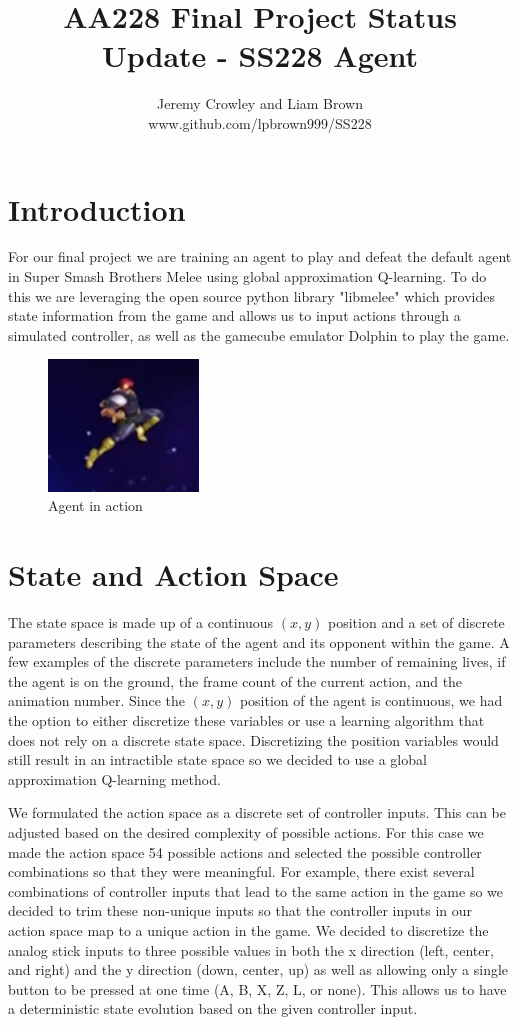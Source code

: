 \documentclass[11pt]{article}
\title{\vspace{-0cm}AA228 Final Project Status Update - SS228 Agent}
\author{Jeremy Crowley and Liam Brown \\ www.github.com/lpbrown999/SS228}
\begin{document}
\maketitle

\section{Introduction}
For our final project we are training an agent to play and defeat the default agent in Super Smash Brothers Melee using global approximation Q-learning. To do this we are leveraging the open source python library "libmelee" which provides state information from the game and allows us to input actions through a simulated controller, as well as the gamecube emulator Dolphin to play the game. 

\begin{figure}[hb]
\centering
	\includegraphics[width=40mm]{logo.png}
	\caption{Agent in action
	\label{overflow}}
\end{figure}

\section{State and Action Space}
The state space is made up of a continuous $(x,y)$ position and a set of discrete parameters describing the state of the agent and its opponent within the game. A few examples of the discrete parameters include the number of remaining lives, if the agent is on the ground, the frame count of the current action, and the animation number. Since the $(x,y)$ position of the agent is continuous, we had the option to either discretize these variables or use a learning algorithm that does not rely on a discrete state space. Discretizing the position variables would still result in an intractible state space so we decided to use a global approximation Q-learning method.

We formulated the action space as a discrete set of controller inputs. This can be adjusted based on the desired complexity of possible actions. For this case we made the action space 54 possible actions and selected the possible controller combinations so that they were meaningful. For example, there exist several combinations of controller inputs that lead to the same action in the game so we decided to trim these non-unique inputs so that the controller inputs in our action space map to a unique action in the game. We decided to discretize the analog stick inputs to three possible values in both the x direction (left, center, and right) and the y direction (down, center, up) as well as allowing only a single button to be pressed at one time (A, B, X, Z, L, or none). This allows us to have a deterministic state evolution based on the given controller input.
\end{document}

